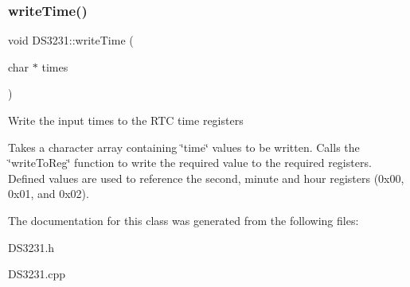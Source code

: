 \subsubsection{\texorpdfstring{write\+Time()}{writeTime()}}
{\footnotesize\ttfamily void D\+S3231\+::write\+Time (\begin{DoxyParamCaption}\item[{char $\ast$}]{times }\end{DoxyParamCaption})}

Write the input times to the R\+TC time registers

Takes a character array containing \char`\"{}time\char`\"{} values to be written. Calls the \char`\"{}write\+To\+Reg\char`\"{} function to write the required value to the required registers. Defined values are used to reference the second, minute and hour registers (0x00, 0x01, and 0x02).

The documentation for this class was generated from the following files\+:\begin{DoxyCompactItemize}
\item 
D\+S3231.\+h\item 
D\+S3231.\+cpp\end{DoxyCompactItemize}
